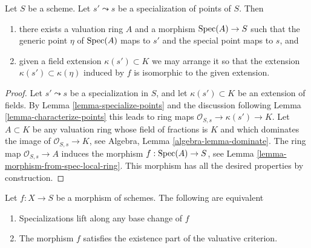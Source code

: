 \begin{lemma}
\label{lemma-points-specialize}
Let $S$ be a scheme. Let $s' \leadsto s$ be a specialization of points of $S$.
Then
\begin{enumerate}
\item there exists a valuation ring $A$ and a morphism
$\mathop{\rm Spec}(A) \to S$ such that the generic point $\eta$ of
$\mathop{\rm Spec}(A)$ maps to $s'$ and the special point maps to $s$, and
\item given a field extension $\kappa(s') \subset K$
we may arrange it so that the extension
$\kappa(s') \subset \kappa(\eta)$ induced by $f$
is isomorphic to the given extension.
\end{enumerate}
\end{lemma}

\begin{proof}
Let $s' \leadsto s$ be a specialization in $S$, and let
$\kappa(s') \subset K$ be an extension of fields. By
Lemma \ref{lemma-specialize-points}
and the discussion following
Lemma \ref{lemma-characterize-points}
this leads to ring maps $\mathcal{O}_{S, s} \to \kappa(s') \to K$.
Let $A \subset K$ be any valuation ring whose field of fractions is
$K$ and which dominates the image of $\mathcal{O}_{S, s} \to K$, see
Algebra, Lemma \ref{algebra-lemma-dominate}.
The ring map $\mathcal{O}_{S, s} \to A$ induces the morphism
$f : \mathop{\rm Spec}(A) \to S$, see
Lemma \ref{lemma-morphism-from-spec-local-ring}.
This morphism has all the desired properties by construction.
\end{proof}

\begin{lemma}
\label{lemma-lift-specializations-valuative}
Let $f : X \to S$ be a morphism of schemes.
The following are equivalent
\begin{enumerate}
\item Specializations lift along any base change of $f$
\item The morphism $f$ satisfies the existence part of the
valuative criterion.
\end{enumerate}
\end{lemma}

